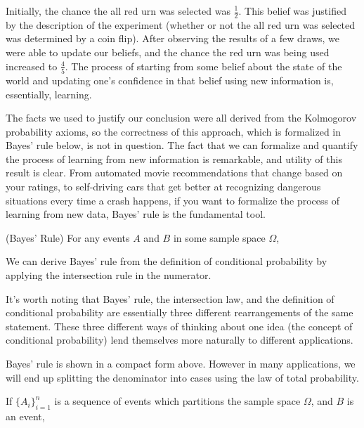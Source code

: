 \par
Initially, the chance the all red urn was selected was $\frac{1}{2}$. This belief was justified by the description of the experiment (whether or not the all red urn was selected was determined by a coin flip). After observing the results of a few draws, we were able to update our beliefs, and the chance the red urn was being used increased to $\frac{4}{5}$. The process of starting from some belief about the state of the world and updating one's confidence in that belief using new information is, essentially, learning.
\par
The facts we used to justify our conclusion were all derived from the Kolmogorov probability axioms, so the correctness of this approach, which is formalized in Bayes' rule below, is not in question. The fact that we can formalize and quantify the process of learning from new information is remarkable, and utility of this result is clear. From automated movie recommendations that change based on your ratings, to self-driving cars that get better at recognizing dangerous situations every time a crash happens, if you want to formalize the process of learning from new data, Bayes' rule is the fundamental tool.
\par
\begin{thm}\label{BayesRule}
(Bayes' Rule) For any events $A$ and $B$ in some sample space $\Omega$,
\end{thm}
\par
\begin{pf} We can derive Bayes' rule from the definition of conditional probability by applying the intersection rule in the numerator.
\end{pf}
\par
It's worth noting that Bayes' rule, the intersection law, and the definition of conditional probability are essentially three different rearrangements of the same statement. These three different ways of thinking about one idea (the concept of conditional probability) lend themselves more naturally to different applications.
\par
Bayes' rule is shown in a compact form above. However in many applications, we will end up splitting the denominator into cases using the law of total probability.
\begin{cor}If $\{A_i\}_{i=1}^n$ is a sequence of events which partitions the sample space $\Omega$, and $B$ is an event,
\end{cor}
